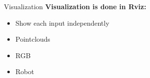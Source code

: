 \begin{frame}{Visualization}
\textbf{Visualization is done in Rviz:}

\begin{itemize}
\item Show each input independently
\item Pointclouds 
\item RGB
\item Robot
\end{itemize}
\end{frame}
